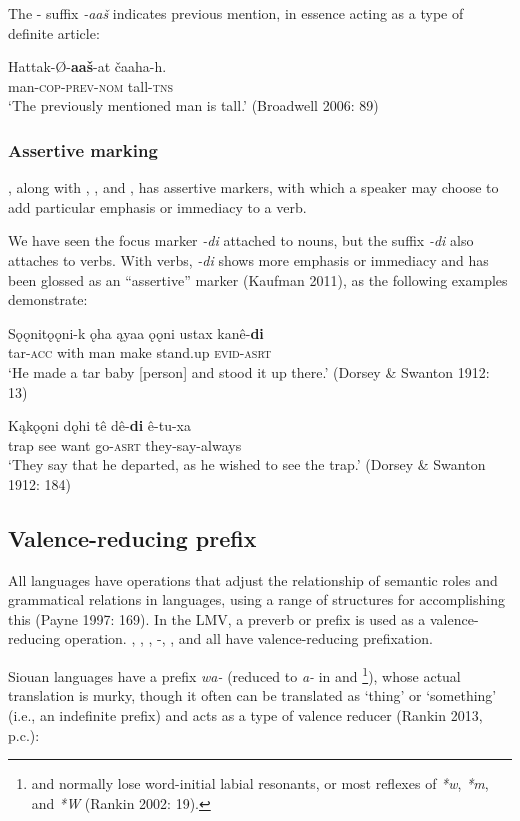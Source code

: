 \documentclass[output=paper]{LSP/langsci}
\begin{document}
	The - suffix \emph{-aaš} indicates previous mention, in essence acting as a type of definite article:

\ea
\gll	Hattak-Ø-\textbf{aaš}-at čaaha-h.\\
	man-\textsc{cop-prev-nom} tall-\textsc{tns} \\
\glt `The previously mentioned man is tall.' 
(Broadwell 2006: 89)
\z

\subsubsection{Assertive marking}

, along with , , and , has assertive markers, with which a speaker may choose to add particular emphasis or immediacy to a verb. 

	We have seen the  focus marker \emph{-di} attached to nouns, but the suffix \emph{-di} also attaches to verbs. With verbs, \emph{-di} shows more emphasis or immediacy and has been glossed as an “assertive” marker (Kaufman 2011), as the following examples demonstrate:

\ea
\gll	Sǫǫnitǫǫni-k ǫha ąyaa ǫǫni ustax kanê-\textbf{di} \\
	tar-\textsc{acc}  with man make stand.up \textsc{evid-asrt}\\
\glt `He made a tar baby [person] and stood it up there.' (Dorsey \& Swanton 1912: 13)
\z

\ea
\gll	Kąkǫǫni dǫhi tê dê-\textbf{di} ê-tu-xa\\
	trap 	 see want go-\textsc{asrt} they-say-always\\
\glt `They say that he departed, as he wished to see the trap.' (Dorsey \& Swanton 1912: 184)
\z

\subsection{Valence-reducing prefix}

All languages have operations that adjust the relationship of semantic roles and grammatical relations in languages, using a range of structures for accomplishing this (Payne 1997: 169). In the LMV, a preverb or prefix is used as a valence-reducing operation. , , , -, , and  all have valence-reducing prefixation. 	

	Siouan languages have a prefix \emph{wa-} (reduced to \emph{a-} in  and \footnote{ and  normally lose word-initial labial resonants, or most reflexes of \emph{*w}, \emph{*m}, and \emph{*W} (Rankin 2002: 19).}), whose actual translation is murky, though it often can be translated as `thing' or `something' (i.e., an indefinite  prefix) and acts as a type of valence reducer (Rankin 2013, p.c.):
\end{document}

